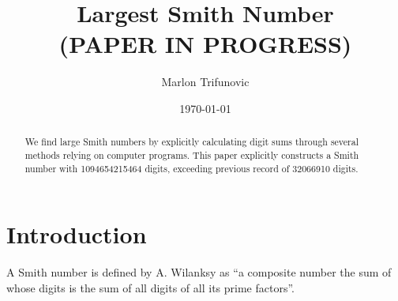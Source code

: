 \documentclass{amsart}
\numberwithin{equation}{section}
\theoremstyle{plain} %
\theoremstyle{definition}
\theoremstyle{remark}
\begin{document}
\title{Largest Smith Number \\ (PAPER IN PROGRESS)}


\author{Marlon Trifunovic}

\address{}






\date{\today}

 \begin{abstract}
We find large Smith numbers by explicitly calculating digit sums through several methods relying on computer programs. This paper explicitly constructs a Smith number with \num{1094654215464} digits, exceeding previous record of \num{32066910} digits.
 \end{abstract}


\maketitle

 \tableofcontents


 \section{Introduction}

A Smith number is defined by A. Wilanksy as ``a composite number the sum of whose digits is the sum of all digits of all its prime factors''\cite{Wilansky1982}.
\end{document}
